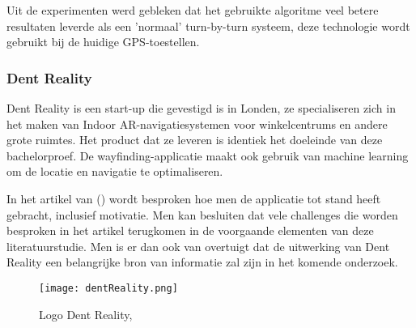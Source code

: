 Uit de experimenten werd gebleken dat het gebruikte algoritme veel betere resultaten leverde als een 'normaal' turn-by-turn systeem, deze technologie wordt gebruikt bij de huidige GPS-toestellen.

\subsubsection{Dent Reality}
Dent Reality is een start-up die gevestigd is in Londen, ze specialiseren zich in het maken van Indoor AR-navigatiesystemen voor winkelcentrums en andere grote ruimtes. Het product dat ze leveren is identiek het doeleinde van deze bachelorproef. De wayfinding-applicatie maakt ook gebruik van machine learning om de locatie en navigatie te optimaliseren.

In het artikel van \textcite{Hart2019} () wordt besproken hoe men de applicatie tot stand heeft gebracht, inclusief motivatie. Men kan besluiten dat vele challenges die worden besproken in het artikel terugkomen in de voorgaande elementen van deze literatuurstudie. Men is er dan ook van overtuigt dat de uitwerking van Dent Reality een belangrijke bron van informatie zal zijn in het komende onderzoek.

\begin{figure}[H]
	\centering
	\texttt{[image: dentReality.png]}
	\caption{Logo Dent Reality, \autocite{Hart2019}}
\end{figure}

